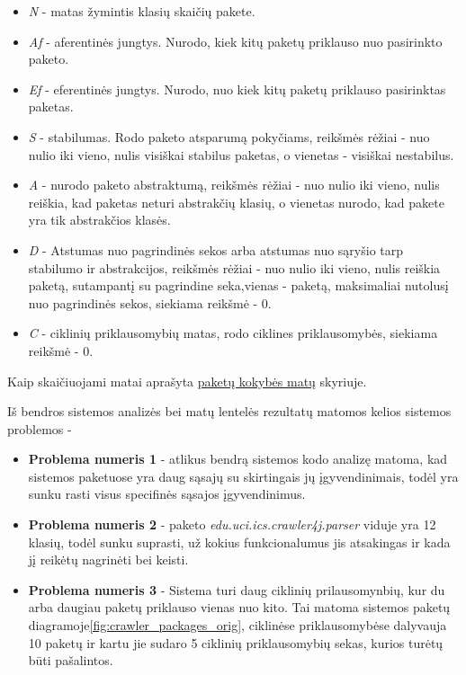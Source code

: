 \begin{itemize}
    \item \textit{N} - matas žymintis klasių skaičių pakete.
    \item \textit{Af} - aferentinės jungtys. Nurodo, kiek kitų paketų priklauso nuo pasirinkto paketo.
    \item \textit{Ef} - eferentinės jungtys. Nurodo, nuo kiek kitų paketų priklauso pasirinktas paketas.
    \item \textit{S} - stabilumas. Rodo paketo atsparumą pokyčiams, reikšmės rėžiai - nuo nulio iki vieno, nulis visiškai stabilus paketas, o vienetas - visiškai nestabilus.
    \item \textit{A} - nurodo paketo abstraktumą, reikšmės rėžiai - nuo nulio iki vieno, nulis reiškia, kad paketas neturi abstrakčių klasių, o vienetas nurodo, kad pakete yra tik abstrakčios klasės.
    \item \textit{D} - Atstumas nuo pagrindinės sekos arba atstumas nuo sąryšio tarp stabilumo ir abstrakcijos, reikšmės rėžiai - nuo nulio iki vieno, nulis reiškia paketą, sutampantį su pagrindine seka,vienas - paketą, maksimaliai nutolusį nuo pagrindinės sekos, siekiama reikšmė - 0.
    \item \textit{C} - ciklinių priklausomybių matas, rodo ciklines priklausomybės, siekiama reikšmė - 0.
\end{itemize}
Kaip skaičiuojami matai aprašyta \hyperref[sec:matai]{paketų kokybės matų} skyriuje.

Iš bendros sistemos analizės bei matų lentelės rezultatų matomos kelios sistemos problemos -
\begin{itemize}
    \item \textbf{Problema numeris 1} - atlikus bendrą sistemos kodo analizę matoma,
    kad sistemos paketuose yra daug sąsajų su skirtingais jų įgyvendinimais, todėl yra sunku
    rasti visus specifinės sąsajos įgyvendinimus.
    \item \textbf{Problema numeris 2} - paketo \textit{edu.uci.ics.crawler4j.parser} viduje yra 12 klasių, todėl sunku suprasti, už kokius funkcionalumus jis atsakingas
    ir kada jį reikėtų nagrinėti bei keisti.
    \item \textbf{Problema numeris 3} - Sistema turi daug ciklinių prilausomynbių, kur du arba daugiau paketų priklauso vienas nuo kito.
    Tai matoma sistemos paketų diagramoje\ref{fig:crawler_packages_orig}, ciklinėse priklausomybėse dalyvauja 10 paketų ir kartu jie sudaro 5 ciklinių priklausomybių sekas,
    kurios turėtų būti pašalintos.
\end{itemize}

